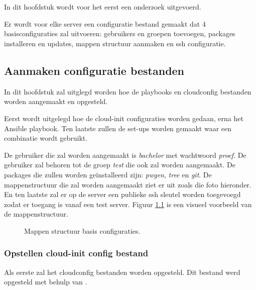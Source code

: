 \chapter{}
\label{ch:basisconf}
In dit hoofdstuk wordt voor het eerst een onderzoek uitgevoerd. 

Er wordt voor elke server een configuratie bestand gemaakt dat 4 basisconfiguraties zal uitvoeren: gebruikers en groepen toevoegen, packages installeren en updates, mappen structuur aanmaken en ssh configuratie. 


\section{Aanmaken configuratie bestanden}
In dit hoofdstuk zal uitglegd worden hoe de playbooks en cloudconfig bestanden worden aangemaakt en opgesteld. 

Eerst wordt uitgelegd hoe de cloud-init configuraties worden gedaan, erna het Ansible playbook. Ten laatste zullen de set-ups worden gemaakt waar een combinatie wordt gebruikt.

De gebruiker die zal worden aangemaakt is \textit{bachelor} met wachtwoord \textit{proef}. De gebruiker zal behoren tot de groep \textit{test} die ook zal worden aangemaakt. De packages die zullen worden geïnstalleerd zijn: \textit{pwgen}, \textit{tree} en \textit{git}. De mappenstructuur die zal worden aangemaakt ziet er uit zoals die foto hieronder. En ten laatste zal er op de server een publieke ssh sleutel worden toegevoegd zodat er toegang is vanaf een test server. Figuur \ref{fig:mappen} is een visueel voorbeeld van de mappenstructuur.

\begin{figure}[!htb]
	\caption{Mappen structuur basis configuraties.}
	\label{fig:mappen}
\end{figure}
\subsection{Opstellen cloud-init config bestand}
Als eerste zal het cloudconfig bestanden worden opgesteld. Dit bestand werd opgesteld met behulp van \autocite{clouddocs}.

